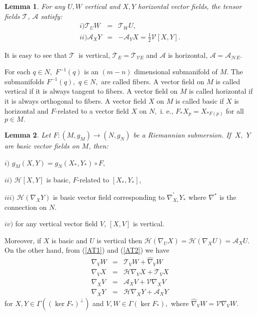 \documentclass{amsart}
\theoremstyle{plain}
\newtheorem{lemma}{Lemma}
\numberwithin{equation}{section}
\begin{document}
\begin{lemma}
For any $U,W$ vertical and $X,Y$ horizontal vector fields, the tensor fields 
$\mathcal{T}$, $\mathcal{A}$ satisfy:\begin{eqnarray}
i)\mathcal{T}_{U}W &=&\mathcal{T}_{W}U,  \label{TUW} \\
ii)\mathcal{A}_{X}Y &=&-\mathcal{A}_{Y}X=\frac{1}{2}\mathcal{V}\left[ X,Y\right] .  \label{TUW2}
\end{eqnarray}
\end{lemma}

It is easy to see that $\mathcal{T}$ $\ $is vertical, $\mathcal{T}_{E}=\mathcal{T}_{\mathcal{V}E}$ and $\mathcal{A}$ is horizontal, $\mathcal{A=A}_{\mathcal{H}E}$.

For each $q\in N,$ $F^{-1}(q)$ is an $(m-n)$ dimensional submanifold of $M$.
The submanifolds $F^{-1}(q),$ $q\in N,$ are called fibers. A vector field on 
$M$ is called vertical if it is always tangent to fibers. A vector field on $M$ is called horizontal if it is always orthogonal to fibers. A vector field 
$X$ on $M$ is called basic if $X$ is horizontal and $F$-related to a vector
field $X$ on $N,$ i. e., $F_{\ast }X_{p}=X_{\ast F(p)}$ for all $p\in M.$

\begin{lemma}
Let $F:(M,g_{M})\rightarrow (N,g_{N})$ be a Riemannian submersion. If $\ X,$ 
$Y$ are basic vector fields on $M$, then:
\end{lemma}

$i)$ $g_{M}(X,Y)=g_{N}(X_{\ast },Y_{\ast })\circ F,$

$ii)$ $\mathcal{H}[X,Y]$ is basic, $F$-related to $[X_{\ast },Y_{\ast }]$,

$iii)$ $\mathcal{H}(\nabla _{X}Y)$ is basic vector field corresponding to $\nabla _{X_{\ast }}^{^{\ast }}Y_{\ast }$ where $\nabla ^{\ast }$ is the
connection on $N.$

$iv)$ for any vertical vector field $V$, $[X,V]$ is vertical.

Moreover, if $X$ is basic and $U$ is vertical then $\mathcal{H}(\nabla
_{U}X)=\mathcal{H}(\nabla _{X}U)=\mathcal{A}_{X}U.$ On the other hand, from (\ref{AT1}) and (\ref{AT2}) we have\begin{eqnarray}
\nabla _{V}W &=&\mathcal{T}_{V}W+\hat{\nabla}_{V}W  \label{1} \\
\nabla _{V}X &=&\mathcal{H\nabla }_{V}X+\mathcal{T}_{V}X  \label{2} \\
\nabla _{X}V &=&\mathcal{A}_{X}V+\mathcal{V}\nabla _{X}V  \label{3} \\
\nabla _{X}Y &=&\mathcal{H\nabla }_{X}Y+\mathcal{A}_{X}Y  \label{4}
\end{eqnarray}for $X,Y\in \Gamma ((\ker F_{\ast })^{\bot })$ and $V,W\in \Gamma (\ker
F_{\ast }),$ where $\hat{\nabla}_{V}W=\mathcal{V}\nabla _{V}W.$
\end{document}
